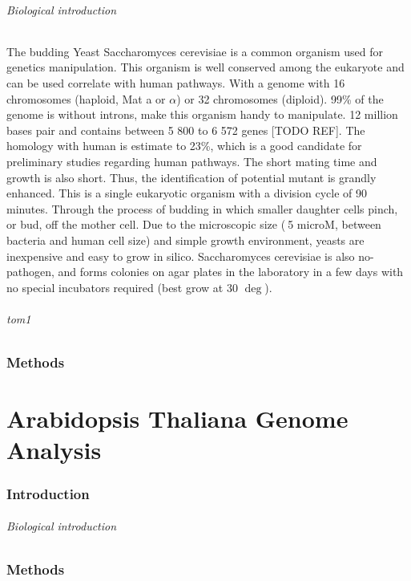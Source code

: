 \documentclass[10pt,a4paper]{article}
\begin{document}
\paragraph{Biological introduction}The budding Yeast Saccharomyces cerevisiae is a common organism used for genetics manipulation. This organism is well conserved among the eukaryote and can be used correlate with human pathways. With a genome with 16 chromosomes (haploid, Mat a or $ \alpha $) or 32 chromosomes (diploid). 99\% of the genome is without introns, make this organism handy to manipulate. 12 million bases pair and contains between 5 800 to 6 572 genes [TODO REF]. The homology with human is estimate to 23\%, which is a good candidate for preliminary studies regarding human pathways. The short mating time and growth is also short. Thus, the identification of potential mutant is grandly enhanced. This is a single eukaryotic organism with a division cycle of 90 minutes. Through the process of budding in which smaller daughter cells pinch, or bud, off the mother cell. Due to the microscopic size ($~$5 microM, between bacteria and human cell size) and simple growth environment, yeasts are inexpensive and easy to grow in silico. Saccharomyces cerevisiae is also no-pathogen, and forms colonies on agar plates in the laboratory in a few days with no special incubators required (best grow at 30 $ \deg $). 

\paragraph{\textit{tom1}} 

\section*{Methods}


\newpage
\part*{Arabidopsis Thaliana Genome Analysis}

\section*{Introduction}
\paragraph{Biological introduction} 


\section*{Methods}
\end{document}
